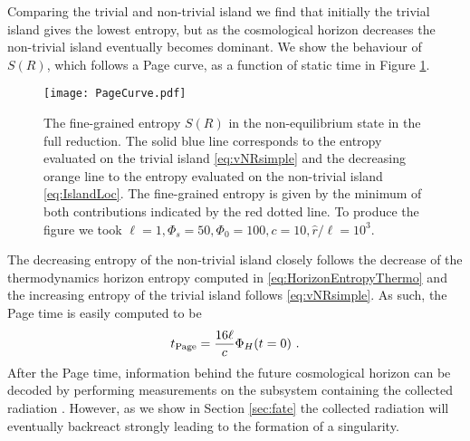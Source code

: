 \documentclass[a4paper,11pt]{article}
\newcommand{\beq}{\begin{equation}}
\newcommand{\eeq}{\end{equation}}
\numberwithin{equation}{section}
\begin{document}
Comparing the trivial and non-trivial island we find that initially the trivial island gives the lowest entropy, but as the cosmological horizon decreases the non-trivial island eventually becomes dominant. We show the behaviour of $S(R)$, which follows a Page curve, as a function of static time in Figure \ref{fig:PageCurve}.
%
\begin{figure}[ht]
\centering
\texttt{[image: PageCurve.pdf]}
\caption{The fine-grained entropy $S(R)$ in the non-equilibrium state in the full reduction. The solid blue line corresponds to the entropy evaluated on the trivial island \eqref{eq:vNRsimple} and the decreasing orange line to the entropy evaluated on the non-trivial island \eqref{eq:IslandLoc}. The fine-grained entropy is given by the minimum of both contributions indicated by the red dotted line. To produce the figure we took $\ell=1, \Phi_s=50, \Phi_0=100, c=10, \hat r/\ell = 10^3$.}
\label{fig:PageCurve}
\end{figure}
%
The decreasing entropy of the non-trivial island closely follows the decrease of the thermodynamics horizon entropy computed in \eqref{eq:HorizonEntropyThermo} and the increasing entropy of the trivial island follows \eqref{eq:vNRsimple}. As such, the Page time is easily computed to be
\beq
t_{\rm Page} = \frac{16\ell}{c}\Phi_H(t=0) ~.
\eeq
After the Page time, information behind the future cosmological horizon can be decoded by performing measurements on the subsystem containing the collected radiation \cite{Hayden:2007cs}. However, as we show in Section \ref{sec:fate} the collected radiation will eventually backreact strongly leading to the formation of a singularity.
\end{document}
